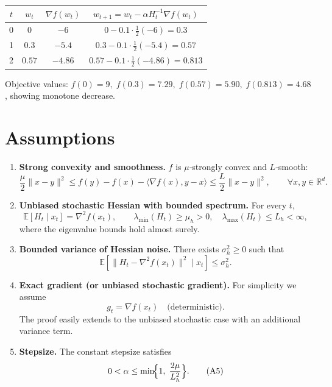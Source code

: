 \documentclass{article}
\begin{document}
\begin{center}
\begin{tabular}{c|c|c|c}
$t$ & $w_{t}$ & $\nabla f(w_{t})$ & $w_{t+1}=w_{t}-\alpha H_{t}^{-1}\nabla f(w_{t})$ \\ \hline
0 & $0$ & $-6$ & $0-0.1\cdot\frac{1}{2}(-6)=0.3$ \\
1 & $0.3$ & $-5.4$ & $0.3-0.1\cdot\frac{1}{2}(-5.4)=0.57$ \\
2 & $0.57$ & $-4.86$ & $0.57-0.1\cdot\frac{1}{2}(-4.86)=0.813$ \\
\end{tabular}
\end{center}
Objective values: $f(0)=9,\; f(0.3)=7.29,\; f(0.57)=5.90,\; f(0.813)=4.68$, showing monotone decrease.

\section*{Assumptions}\label{sec:assumptions}
\begin{enumerate}[label=(A\arabic*)]
\item \textbf{Strong convexity and smoothness.} $f$ is $\mu$‑strongly convex and $L$‑smooth:
\[
\frac{\mu}{2}\|x-y\|^{2}\le f(y)-f(x)-\langle\nabla f(x),y-x\rangle
\le\frac{L}{2}\|x-y\|^{2},\qquad\forall x,y\in\mathbb{R}^{d}.
\tag{A1}
\]

\item \textbf{Unbiased stochastic Hessian with bounded spectrum.} For every $t$,
\[
\mathbb{E}[H_{t}\mid x_{t}]=\nabla^{2}f(x_{t}),\qquad
\lambda_{\min}(H_{t})\ge \mu_{h}>0,\quad
\lambda_{\max}(H_{t})\le L_{h}<\infty,
\tag{A2}
\]
where the eigenvalue bounds hold almost surely.

\item \textbf{Bounded variance of Hessian noise.} There exists $\sigma_{h}^{2}\ge0$ such that
\[
\mathbb{E}\!\left[\|H_{t}-\nabla^{2}f(x_{t})\|^{2}\mid x_{t}\right]\le\sigma_{h}^{2}.
\tag{A3}
\]

\item \textbf{Exact gradient (or unbiased stochastic gradient).} For simplicity we assume
\[
g_{t}=\nabla f(x_{t})\quad\text{(deterministic)}.
\tag{A4}
\]
The proof easily extends to the unbiased stochastic case with an additional variance term.

\item \textbf{Stepsize.} The constant stepsize satisfies 
\[
0<\alpha\le \min\!\Bigl\{1,\;\frac{2\mu}{L_{h}^{2}}\Bigr\}.
\tag{A5}
\]
\end{enumerate}
\end{document}
